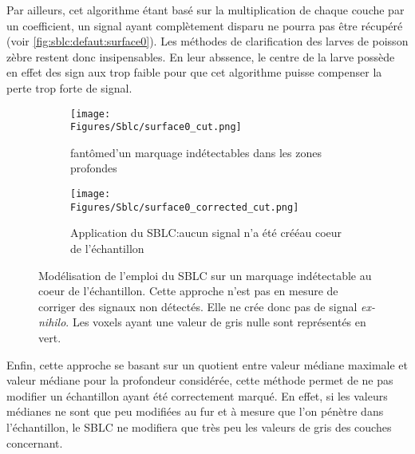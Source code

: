 \documentclass[\main/main.tex]{subfiles}
\begin{document}
%
Par ailleurs, cet algorithme étant basé sur la multiplication de chaque couche par
un coefficient, un signal ayant complètement disparu ne pourra pas être récupéré (voir \autoref{fig:sblc:defaut:surface0}). Les méthodes de clarification des larves de poisson zèbre restent donc insipensables. En leur abssence, le centre de la larve possède en effet des sign	aux trop faible pour que cet algorithme puisse compenser la perte trop forte de signal.
%
\begin{figure}
    \centering
    \begin{subfigure}[b]{0.45\textwidth}
        
        \caption{fantôme\newline d'un marquage indétectables dans les zones profondes}
        \centering \texttt{[image: \\Figures/Sblc/surface0\_cut.png]}
        \label{fig:sblc:defaut:surface0:application}
    \end{subfigure}
    \begin{subfigure}[b]{0.45\textwidth} 
        \caption{Application du SBLC:\newline aucun signal n'a été créé\newline au coeur de l'échantillon}
        \centering \texttt{[image: \\Figures/Sblc/surface0\_corrected\_cut.png]}
        \label{fig:sblc:defaut:surface0:application}
    \end{subfigure}
    \caption{
        Modélisation de l'emploi du SBLC sur un marquage indétectable au coeur de l'échantillon.
        \newline
        Cette approche n'est pas en mesure de corriger des signaux non détectés.
        Elle ne crée donc pas de signal \emph{ex\hyp{}nihilo}.
        \newline
        Les voxels ayant une valeur de gris nulle sont représentés en vert.
        }
    \label{fig:sblc:defaut:surface0}
\end{figure}

%
Enfin, cette approche se basant sur un quotient entre valeur médiane maximale et valeur médiane pour la profondeur considérée, cette méthode permet de ne pas modifier un échantillon ayant été correctement marqué.
%
En effet, si les valeurs médianes ne sont que peu modifiées au fur et à mesure que l'on pénètre dans l'échantillon, le SBLC ne modifiera que très peu les valeurs de gris des couches concernant.
\end{document}
